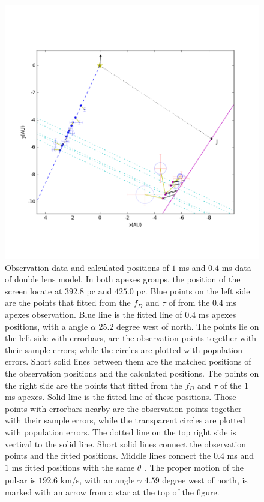 \documentclass[useAMS,usenatbib]{mn2e}
\begin{document}
\begin{figure}
\centering
\includegraphics[width=1.0\textwidth, angle=0]{Double_lens_xy.png}
\caption{Observation data and calculated positions of $1$ ms and $0.4$ ms data of double lens model. In both apexes groups, the position of the screen locate at $392.8$ pc and $425.0$ pc. Blue points on the left side are the points that fitted from the $f_D$ and $\tau$ of from the $0.4$ ms apexes observation. Blue line is the fitted line of $0.4$ ms apexes positions, with a angle $\alpha$ $25.2$ degree west of north. The points lie on the left side with errorbars, are the observation points together with their sample errors; while the circles are plotted with population errors. Short solid lines between them are the matched positions of the observation positions and the calculated positions. The points on the right side are the points that fitted from the $f_D$ and $\tau$ of the $1$ ms apexes. Solid line is the fitted line of these positions. Those points with errorbars nearby are the observation points together with their sample errors, while the transparent circles are plotted with population errors. The dotted line on the top right side is vertical to the solid line. Short solid lines connect the observation points and the fitted positions. Middle lines connect the $0.4$ ms and $1$ ms fitted positions with the same $\theta_{\parallel}$. The proper motion of the pulsar is $192.6$ km/s, with an angle $\gamma$ $4.59$ degree west of north, is marked with an arrow from a star at the top of the figure.}
\label{Doublelens}
\end{figure}
\end{document}

